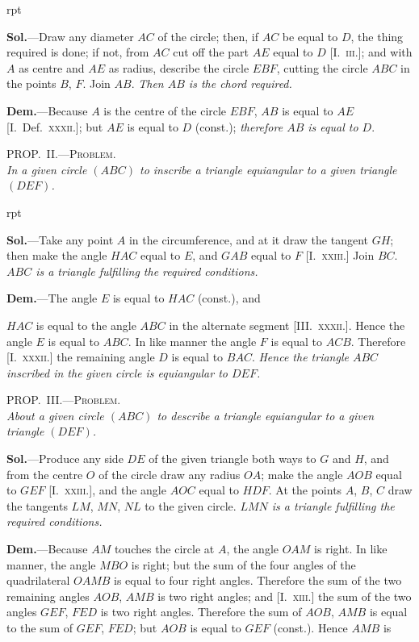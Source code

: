 \documentclass[oneside]{book}
\newcounter{wrapwidth}
\newcommand\myprop[2]{
\bigskip\Needspace*{4\baselineskip}\begin{center}\textsc{#1}\\\medskip\emph{#2}\par\end{center}
}
\newcommand\imgflow[3]{
\setcounter{wrapwidth}{#1}

\begin{wrapfigure}[#2]{r}{\value{wrapwidth}pt}
\begin{center}
\vspace{-0.3in}

\end{center}
\end{wrapfigure}
}
\newcommand\imgcent[2]{
\begin{center}

\end{center}
}
\begin{document}
\imgflow{180}{9}{f151}

\textbf{Sol.}---Draw any diameter $AC$ of the circle; then, if
$AC$ be equal to $D$,
the thing required is
done; if not, from $AC$
cut off the part $AE$
equal to $D$ [I.~\textsc{iii.}];
and with $A$ as centre
and $AE$ as radius, describe
the circle $EBF$,
cutting the circle $ABC$
in the points $B$, $F$. Join $AB$. \textit{Then $AB$ is the chord
required.}

\textbf{Dem.}---Because $A$ is the centre of the circle $EBF$,
$AB$ is equal to $AE$ [I.~Def.~\textsc{xxxii.}]; but $AE$ is equal
to $D$ (const.); \emph{therefore $AB$ is equal to $D$}.

\myprop{PROP\@.~II\@.---Problem.}{In a given circle $(ABC)$ to inscribe a triangle equiangular
to a given triangle $(DEF)$.}


\imgflow{170}{9}{f152}

\textbf{Sol.}---Take any point $A$ in the circumference, and
at it draw the tangent
$GH$; then make the
angle $HAC$ equal to
$E$, and $GAB$ equal to
$F$ [I.~\textsc{xxiii.}] Join $BC$.
\textit{$ABC$ is a triangle fulfilling
the required conditions.}

\textbf{Dem.}---The angle $E$ is equal to $HAC$ (const.), and

$HAC$ is equal to the angle $ABC$ in the alternate segment
[III\@.~\textsc{xxxii.}]. Hence the angle $E$ is equal to
$ABC$. In like manner the angle $F$ is equal to $ACB$.
Therefore [I.~\textsc{xxxii.}] the remaining angle $D$ is equal to
$BAC$. \textit{Hence the triangle $ABC$ inscribed in the given
circle is equiangular to $DEF$.}

\myprop{PROP\@.~III\@.---Problem.}{About a given circle $(ABC)$ to describe a triangle equiangular
to a given triangle $(DEF)$.}

\textbf{Sol.}---Produce any side $DE$ of the given triangle
both ways to $G$ and $H$, and from the centre $O$ of the
circle draw any radius $OA$; make the angle $AOB$
equal to $GEF$ [I.~\textsc{xxiii.}], and the angle $AOC$ equal to
$HDF$. At the points $A$, $B$, $C$ draw the tangents $LM$,
$MN$, $NL$ to the given circle. \emph{$LMN$ is a triangle fulfilling
the required conditions.}


\imgcent{230}{f153}

\textbf{Dem.}---Because $AM$ touches the circle at $A$, the
angle $OAM$ is right. In like manner, the angle $MBO$
is right; but the sum of the four angles of the quadrilateral
$OAMB$ is equal to four right angles. Therefore
the sum of the two remaining angles $AOB$, $AMB$
is two right angles; and [I.~\textsc{xiii.}] the sum of the two
angles $GEF$, $FED$ is two right angles. Therefore the
sum of $AOB$, $AMB$ is equal to the sum of $GEF$, $FED$;
but $AOB$ is equal to $GEF$ (const.). Hence $AMB$ is
\end{document}
